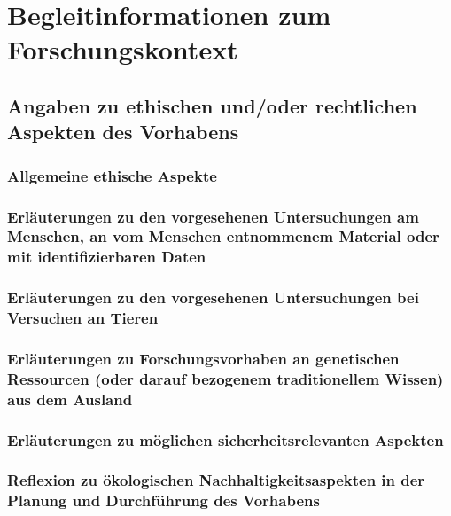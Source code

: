 \documentclass[ngerman]{scrartcl}
\begin{document}
\section{Begleitinformationen zum Forschungskontext}

\subsection{Angaben zu ethischen und/oder rechtlichen Aspekten des Vorhabens}

\subsubsection{Allgemeine ethische Aspekte}

\subsubsection{Erläuterungen zu den vorgesehenen Untersuchungen am Menschen, an vom Menschen entnommenem Material oder mit identifizierbaren Daten}

\subsubsection{Erläuterungen zu den vorgesehenen Untersuchungen bei Versuchen an Tieren}

\subsubsection{Erläuterungen zu Forschungsvorhaben an genetischen Ressourcen (oder darauf bezogenem traditionellem Wissen) aus dem Ausland}

\subsubsection{Erläuterungen zu möglichen sicherheitsrelevanten Aspekten}



\subsubsection{Reflexion zu ökologischen Nachhaltigkeitsaspekten in der Planung und Durchführung des Vorhabens}
\end{document}
